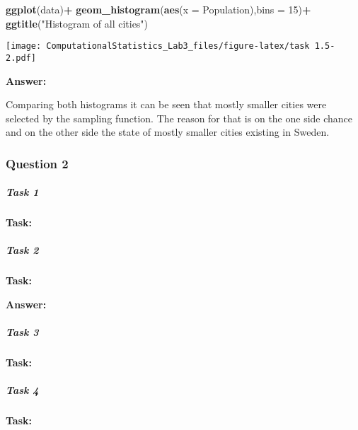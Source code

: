 \documentclass[]{article}
\newenvironment{Shaded}{\begin{snugshade}}{\end{snugshade}}
\newcommand{\KeywordTok}[1]{\textcolor[rgb]{0.13,0.29,0.53}{\textbf{#1}}}
\newcommand{\DataTypeTok}[1]{\textcolor[rgb]{0.13,0.29,0.53}{#1}}
\newcommand{\DecValTok}[1]{\textcolor[rgb]{0.00,0.00,0.81}{#1}}
\newcommand{\StringTok}[1]{\textcolor[rgb]{0.31,0.60,0.02}{#1}}
\newcommand{\OperatorTok}[1]{\textcolor[rgb]{0.81,0.36,0.00}{\textbf{#1}}}
\newcommand{\NormalTok}[1]{#1}
\let\oldsubparagraph\subparagraph
\renewcommand{\subparagraph}[1]{\oldsubparagraph{#1}\mbox{}}
\begin{document}
\begin{Shaded}
\begin{Highlighting}[]
\KeywordTok{ggplot}\NormalTok{(data)}\OperatorTok{+}
\StringTok{  }\KeywordTok{geom_histogram}\NormalTok{(}\KeywordTok{aes}\NormalTok{(}\DataTypeTok{x =}\NormalTok{ Population),}\DataTypeTok{bins =} \DecValTok{15}\NormalTok{)}\OperatorTok{+}
\StringTok{  }\KeywordTok{ggtitle}\NormalTok{(}\StringTok{"Histogram of all cities"}\NormalTok{)}
\end{Highlighting}
\end{Shaded}

\texttt{[image: ComputationalStatistics\_Lab3\_files/figure-latex/task 1.5-2.pdf]}

\textbf{Answer: }

Comparing both histograms it can be seen that mostly smaller cities were
selected by the sampling function. The reason for that is on the one
side chance and on the other side the state of mostly smaller cities
existing in Sweden.

\subsubsection{Question 2}\label{question-2}

\subparagraph{Task 1}\label{task-1}

\textbf{Task: }

\subparagraph{Task 2}\label{task-2-1}

\textbf{Task:}

\textbf{Answer:}

\subparagraph{Task 3}\label{task-3-1}

\textbf{Task:}

\subparagraph{Task 4}\label{task-4-1}

\textbf{Task: }
\end{document}
